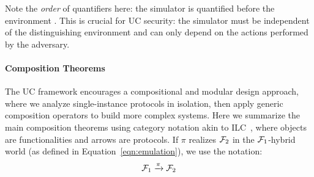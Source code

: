 Note the \emph{order} of quantifiers here: the simulator \Sim is quantified before the environment \Z.
This is crucial for UC security: the simulator must be independent of the distinguishing environment
and can only depend on the actions performed by the adversary. 


\paragraph*{\textbf{Composition Theorems}}
The UC framework encourages a compositional and modular design approach,
where we analyze single-instance protocols in isolation, then apply generic composition operators to build more complex systems.
Here we summarize the main composition theorems using category notation akin to ILC~\cite{ilc},
where objects are functionalities and arrows are protocols.
If $\pi$ realizes $\mathcal{F}_2$ in the $\mathcal{F}_1$-hybrid world (as defined in Equation~\ref{eqn:emulation}), we use the notation:
\[
    \mathcal{F}_1 \xrightarrow{\pi} \mathcal{F}_2
\]

